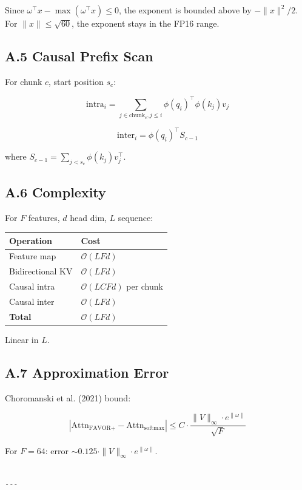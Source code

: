 Since $\omega^\top x - \max(\omega^\top x) \leq 0$, the exponent is bounded 
above by $-\|x\|^2/2$. For $\|x\| \leq \sqrt{60}$, the exponent stays in 
the FP16 range.

\subsection{A.5 Causal Prefix Scan}

For chunk $c$, start position $s_c$:

\[
\text{intra}_i = \sum_{j \in \text{chunk}_c, j \leq i} \phi(q_i)^\top \phi(k_j) v_j
\tag{A.6}
\]

\[
\text{inter}_i = \phi(q_i)^\top S_{c-1}
\tag{A.7}
\]

where $S_{c-1} = \sum_{j < s_c} \phi(k_j) v_j^\top$.

\subsection{A.6 Complexity}

For $F$ features, $d$ head dim, $L$ sequence:

\begin{table}[H]
\centering
\small
\begin{tabular}{ll}
\toprule
\textbf{Operation} & \textbf{Cost} \\
\midrule
Feature map & $\mathcal{O}(L F d)$ \\
Bidirectional KV & $\mathcal{O}(L F d)$ \\
Causal intra & $\mathcal{O}(L C F d)$ per chunk \\
Causal inter & $\mathcal{O}(L F d)$ \\
\textbf{Total} & $\mathcal{O}(L F d)$ \\
\bottomrule
\end{tabular}
\end{table}

Linear in $L$.

\subsection{A.7 Approximation Error}

Choromanski et al. (2021) bound:

\[
\left|\text{Attn}_{\text{FAVOR+}} - \text{Attn}_{\text{softmax}}\right| \leq C \cdot \frac{\|V\|_\infty \cdot e^{\|\omega\|}}{\sqrt{F}}
\tag{A.8}
\]

For $F = 64$: error $\sim 0.125 \cdot \|V\|_\infty \cdot e^{\|\omega\|}$.
\begin{lstlisting}

---
\end{lstlisting}